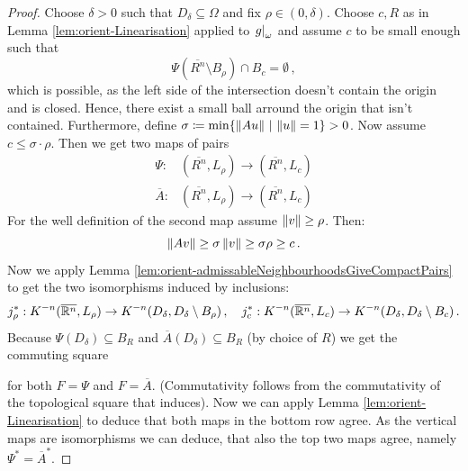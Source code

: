\begin{proof}
    Choose $\delta>0$ such that $D_\delta\subseteq \Omega$ and fix $\rho \in (0,\delta)$. Choose $c,R$ as in Lemma \ref{lem:orient-Linearisation} applied to $\left.g\right|_{\omega}$ and assume $c$ to be small enough such that 
    \begin{equation}
        \Psi(\overline{R^n}\setminus B_\rho) \cap B_c=\emptyset\,,
    \end{equation} which is possible, as the left side of the intersection doesn't contain the origin and is closed.  Hence, there exist a small ball arround the origin that isn't contained. Furthermore, define $\sigma\coloneq \min\{\left\lVert Au\right\rVert\,|\, \left\lVert u\right\rVert=1\}>0$. Now assume $c\leq \sigma\cdot \rho$. Then we get two maps of pairs 
    \begin{align*}
        \Psi: &(\overline{R^n},L_\rho)\to (\overline{R^n},L_c)\\
        \overline{A}: &(\overline{R^n},L_\rho)\to (\overline{R^n},L_c)
    \end{align*}For the well definition of the second map assume $\left\lVert v\right\rVert\geq \rho$. Then: 
    \begin{equation*}
        \left\lVert Av\right\rVert\geq \sigma \left\lVert v\right\rVert \geq \sigma \rho \geq c \,.
    \end{equation*}
    Now we apply Lemma \ref{lem:orient-admissableNeighbourhoodsGiveCompactPairs} to get the two isomorphisms induced by inclusions:
    \begin{equation*}
        j_\rho^*:K^{-n}(\overline{\mathbb{R}^n},L_\rho)\to K^{-n}(D_\delta,D_\delta\setminus B_\rho)\,,\quad 
        j_c^*:K^{-n}(\overline{\mathbb{R}^n},L_c)\to K^{-n}(D_\delta,D_\delta\setminus B_c)\,.
    \end{equation*}
    Because $\Psi(D_\delta)\subseteq B_R$ and $\overline{A}(D_\delta)\subseteq B_R$ (by choice of $R$) we get the commuting square
    \begin{center}
    \end{center}for both $F=\Psi$ and $F=\overline{A}$. (Commutativity follows from the commutativity of the topological square that induces). Now we can apply Lemma \ref{lem:orient-Linearisation} to deduce that both maps in the bottom row agree. As the vertical maps are isomorphisms we can deduce, that also the top two maps agree, namely $\Psi^*=\overline{A}^*$.

\end{proof}
